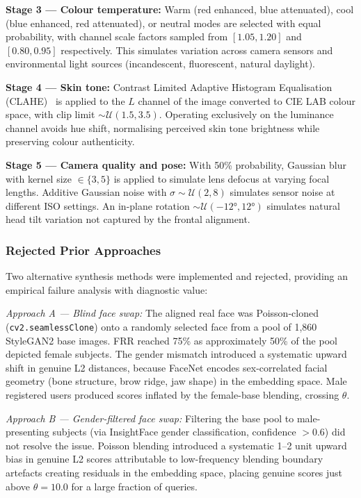 \documentclass[conference]{IEEEtran}
\begin{document}
\textbf{Stage 3 — Colour temperature:} Warm (red enhanced, blue attenuated), cool (blue enhanced, red attenuated), or neutral modes are selected with equal probability, with channel scale factors sampled from $[1.05, 1.20]$ and $[0.80, 0.95]$ respectively. This simulates variation across camera sensors and environmental light sources (incandescent, fluorescent, natural daylight).

\textbf{Stage 4 — Skin tone:} Contrast Limited Adaptive Histogram Equalisation (CLAHE)~\cite{clahe} is applied to the $L$ channel of the image converted to CIE LAB colour space, with clip limit $\sim \mathcal{U}(1.5, 3.5)$. Operating exclusively on the luminance channel avoids hue shift, normalising perceived skin tone brightness while preserving colour authenticity.

\textbf{Stage 5 — Camera quality and pose:} With 50\% probability, Gaussian blur with kernel size $\in\{3, 5\}$ is applied to simulate lens defocus at varying focal lengths. Additive Gaussian noise with $\sigma \sim \mathcal{U}(2, 8)$ simulates sensor noise at different ISO settings. An in-plane rotation $\sim \mathcal{U}(-12°, 12°)$ simulates natural head tilt variation not captured by the frontal alignment.

\subsubsection{Rejected Prior Approaches}

Two alternative synthesis methods were implemented and rejected, providing an empirical failure analysis with diagnostic value:

\textit{Approach A — Blind face swap:} The aligned real face was Poisson-cloned (\texttt{cv2.seamlessClone}) onto a randomly selected face from a pool of 1,860 StyleGAN2 base images. FRR reached 75\% as approximately 50\% of the pool depicted female subjects. The gender mismatch introduced a systematic upward shift in genuine L2 distances, because FaceNet encodes sex-correlated facial geometry (bone structure, brow ridge, jaw shape) in the embedding space. Male registered users produced scores inflated by the female-base blending, crossing $\theta$.

\textit{Approach B — Gender-filtered face swap:} Filtering the base pool to male-presenting subjects (via InsightFace gender classification, confidence $> 0.6$) did not resolve the issue. Poisson blending introduced a systematic 1--2 unit upward bias in genuine L2 scores attributable to low-frequency blending boundary artefacts creating residuals in the embedding space, placing genuine scores just above $\theta\!=\!10.0$ for a large fraction of queries.
\end{document}
